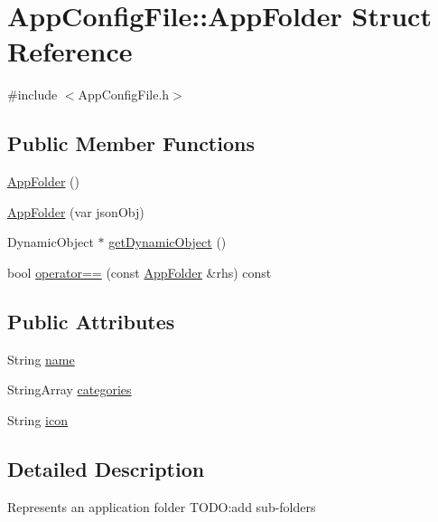 \hypertarget{structAppConfigFile_1_1AppFolder}{}\section{App\+Config\+File\+:\+:App\+Folder Struct Reference}
\label{structAppConfigFile_1_1AppFolder}


{\ttfamily \#include $<$App\+Config\+File.\+h$>$}

\subsection*{Public Member Functions}
\begin{DoxyCompactItemize}
\item 
\mbox{\hyperlink{structAppConfigFile_1_1AppFolder_af1be381da9dbff110c264b87bc7f17c5}{App\+Folder}} ()
\item 
\mbox{\hyperlink{structAppConfigFile_1_1AppFolder_a25fc3a0c186eb6c8e8b33ec81b0af351}{App\+Folder}} (var json\+Obj)
\item 
Dynamic\+Object $\ast$ \mbox{\hyperlink{structAppConfigFile_1_1AppFolder_a732e9a0d7b452b87aaf20e918c220d10}{get\+Dynamic\+Object}} ()
\item 
bool \mbox{\hyperlink{structAppConfigFile_1_1AppFolder_a8000c200e25a1af90807fb00902d8c63}{operator==}} (const \mbox{\hyperlink{structAppConfigFile_1_1AppFolder}{App\+Folder}} \&rhs) const
\end{DoxyCompactItemize}
\subsection*{Public Attributes}
\begin{DoxyCompactItemize}
\item 
String \mbox{\hyperlink{structAppConfigFile_1_1AppFolder_ac4a3f42ba47f0f55b09c0c7cf30f9614}{name}}
\item 
String\+Array \mbox{\hyperlink{structAppConfigFile_1_1AppFolder_a8ab88b3fc73a717add1b57c1f2619ec4}{categories}}
\item 
String \mbox{\hyperlink{structAppConfigFile_1_1AppFolder_a1eb7b7f0c9b50d4769fb8bc8a8d27a73}{icon}}
\end{DoxyCompactItemize}


\subsection{Detailed Description}
Represents an application folder T\+O\+DO\+:add sub-\/folders 

